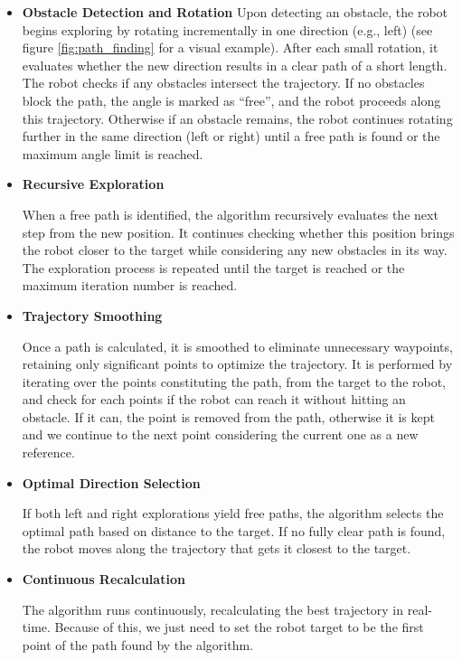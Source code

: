 \begin{itemize}
    \item \textbf{Obstacle Detection and Rotation}
    Upon detecting an obstacle, the robot begins exploring by rotating incrementally in one direction (e.g., left) (see figure \ref{fig:path_finding} for a visual example). After each small rotation, it evaluates whether the new direction results in a clear path of a short length. The robot checks if any obstacles intersect the trajectory.
    If no obstacles block the path, the angle is marked as “free”, and the robot proceeds along this trajectory.
    Otherwise if an obstacle remains, the robot continues rotating further in the same direction (left or right) until a free path is found or the maximum angle limit is reached.

    \item \textbf{Recursive Exploration}

    When a free path is identified, the algorithm recursively evaluates the next step from the new position. It continues checking whether this position brings the robot closer to the target while considering any new obstacles in its way. The exploration process is repeated until the target is reached or the maximum iteration number is reached.

    \item \textbf{Trajectory Smoothing}

    Once a path is calculated, it is smoothed to eliminate unnecessary waypoints, retaining only significant points to optimize the trajectory. It is performed by iterating over the points constituting the path, from the target to the robot, and check for each points if the robot can reach it without hitting an obstacle. If it can, the point is removed from the path, otherwise it is kept and we continue to the next point considering the current one as a new reference.

    \item \textbf{Optimal Direction Selection}

    If both left and right explorations yield free paths, the algorithm selects the optimal path based on distance to the target. If no fully clear path is found, the robot moves along the trajectory that gets it closest to the target.

    \item \textbf{Continuous Recalculation}

    The algorithm runs continuously, recalculating the best trajectory in real-time. Because of this, we just need to set the robot target to be the first point of the path found by the algorithm.
\end{itemize}


